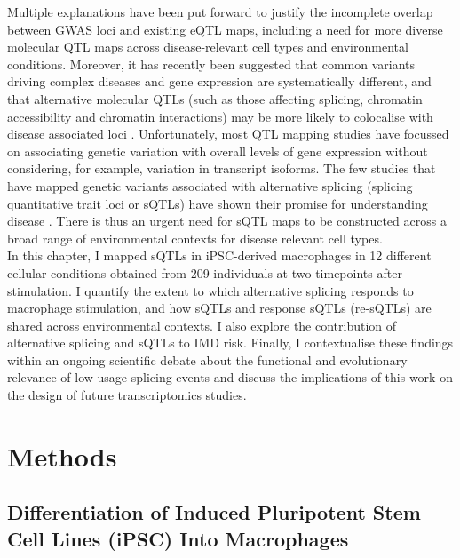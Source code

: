 Multiple explanations have been put forward to justify the incomplete overlap between GWAS loci and existing eQTL maps, including a need for more diverse molecular QTL maps across disease-relevant cell types and environmental conditions. Moreover, it has recently been suggested that common variants driving complex diseases and gene expression are systematically different, and that alternative molecular QTLs (such as those affecting splicing, chromatin accessibility and chromatin interactions) may be more likely to colocalise with disease associated loci \cite{Mostafavi2022-tg}. Unfortunately, most QTL mapping studies have focussed on associating genetic variation with overall levels of gene expression without considering, for example, variation in transcript isoforms. The few studies that have mapped genetic variants associated with alternative splicing (splicing quantitative trait loci or sQTLs) have shown their promise for understanding disease \cite{Li2016-wu,Kim-Hellmuth2020-gz}. There is thus an urgent need for sQTL maps to be constructed across a broad range of environmental contexts for disease relevant cell types. \\

In this chapter, I mapped sQTLs in iPSC-derived macrophages in 12 different cellular conditions obtained from 209 individuals at two timepoints after stimulation. I quantify the extent to which alternative splicing responds to macrophage stimulation, and how sQTLs and response sQTLs (re-sQTLs) are shared across environmental contexts. I also explore the contribution of alternative splicing and sQTLs to IMD risk. Finally, I contextualise these findings within an ongoing scientific debate about the functional and evolutionary relevance of low-usage splicing events and discuss the implications of this work on the design of future transcriptomics studies. \\
\section{Methods}

\subsection{Differentiation of Induced Pluripotent Stem Cell Lines (iPSC) Into Macrophages}


